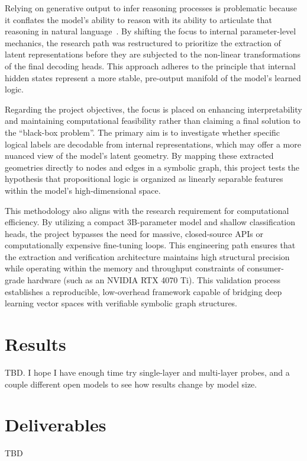 \documentclass[12 pt]{article}  %
\begin{document}
Relying on generative output to infer reasoning processes is problematic because 
it conflates the model's ability to reason with its ability to articulate that 
reasoning in natural language~\cite{cheng2025empoweringllmslogicalreasoning}. 
By shifting the focus to internal parameter-level mechanics, the research path 
was restructured to prioritize the extraction of latent representations before 
they are subjected to the non-linear transformations of the final decoding heads. 
This approach adheres to the principle that internal hidden states represent a 
more stable, pre-output manifold of the model's learned logic.

Regarding the project objectives, the focus is placed on enhancing 
interpretability and maintaining computational feasibility rather than claiming 
a final solution to the ``black-box problem''. The primary aim is to investigate 
whether specific logical labels are decodable from internal representations, 
which may offer a more nuanced view of the model's latent geometry. By mapping 
these extracted geometries directly to nodes and edges in a symbolic graph, 
this project tests the hypothesis that propositional logic is organized as 
linearly separable features within the model's high-dimensional space.

This methodology also aligns with the research requirement for computational 
efficiency. By utilizing a compact 3B-parameter model and shallow classification 
heads, the project bypasses the need for massive, closed-source APIs or 
computationally expensive fine-tuning loops. This engineering path ensures that 
the extraction and verification architecture maintains high structural precision 
while operating within the memory and throughput constraints of consumer-grade 
hardware (such as an NVIDIA RTX 4070 Ti). This validation process establishes a 
reproducible, low-overhead framework capable of bridging deep learning vector 
spaces with verifiable symbolic graph structures.

\newpage
\section{Results}
TBD. I hope I have enough time try single-layer and multi-layer probes, and a 
couple different open models to see how results change by model size.

\newpage
\section{Deliverables}
TBD

\cleardoublepage


\end{document}
